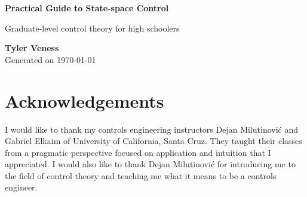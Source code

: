 \documentclass[10pt,conference,compsoc]{IEEEtran}
\begin{document}


\begin{titlepage}
  \begin{center}
    \vspace*{1cm}

    \Huge
    \textbf{Practical Guide to State-space Control}

    \vspace{0.5cm}
    \LARGE
    Graduate-level control theory for high schoolers

    \vspace{1.5cm}

    \textbf{Tyler Veness} \\

    \vspace{1.5cm}
    \normalsize
    Generated on \monthdayyeardate\today

    \vfill

    \vspace{0.8cm}

  \end{center}

  \vfill


  \vspace{0.8cm}
\end{titlepage}
\thispagestyle{empty}  %

\renewcommand\contentsname{Table of Contents}
\tableofcontents
\listoffigures
\listoftables
\listofsnippets
\thispagestyle{empty}  %
\clearpage


\section*{Acknowledgements}

I would like to thank my controls engineering instructors Dejan Milutinovi\'c
and Gabriel Elkaim of University of California, Santa Cruz. They taught their
classes from a pragmatic perspective focused on application and intuition that I
appreciated. I would also like to thank Dejan Milutinovi\'c for introducing me
to the field of control theory and teaching me what it means to be a controls
engineer.
\end{document}
